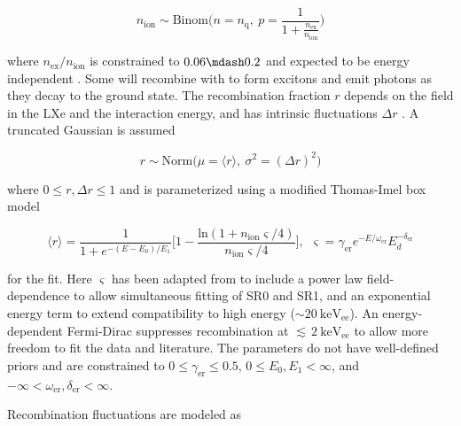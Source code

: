 \begin{equation}
n_{\mathrm{ion}} \sim \mathrm{Binom} \Bigg(n = n_{\mathrm{q}},\ p = \frac{1}{1 + \frac{n_{\mathrm{ex}}}{n_{\mathrm{ion}}}} \Bigg)
\label{eq:er_nr_calibrations_parameter_determ_er_nions}
\end{equation}

\noindent where $n_{\mathrm{ex}} / n_{\mathrm{ion}}$ is constrained to $0.06 \mdash 0.2$ and expected to be energy independent
.  Some \electron will recombine with  to form
excitons and emit photons as they decay to the ground state.  The recombination fraction $r$ depends on the field in the LXe and the
interaction energy, and has intrinsic fluctuations $\Delta r$ .  A truncated Gaussian is assumed

\vspace{-10pt}

\begin{equation}
r \sim \mathrm{Norm} \Big( \mu = \langle r \rangle,\ \sigma^2 = (\Delta r)^2 \Big)
\end{equation}

\noindent where $0 \leq r, \Delta r \leq 1$ and is parameterized using a modified Thomas-Imel box model 

\vspace{-15pt}

\begin{equation}
\langle r \rangle = \frac{1}{1 + e^{-(E - E_0) / E_1}}
\bigg[ 1 - \frac{\mathrm{ln}(1 + n_{\mathrm{ion}} \varsigma / 4)}{n_{\mathrm{ion}} \varsigma / 4} \bigg]
,\ \ \varsigma = \gamma_{\mathrm{er}} e^{-E / \omega_{\mathrm{er}}} E_d^{-\delta_{\mathrm{er}}}
\label{eq:er_nr_calibrations_parameter_determ_ti}
\end{equation}

\noindent for the fit.  Here $\varsigma$ has been adapted from  to include a power law field-dependence to allow
simultaneous fitting of SR0 and SR1, and an exponential energy term to extend compatibility to high energy
(${\sim} 20\ \mathrm{keV_{ee}}$).  An energy-dependent Fermi-Dirac suppresses recombination at
${\lesssim}\, 2\ \mathrm{keV_{ee}}$ to allow more freedom to fit the data and literature.  The parameters do not have well-defined priors
and are constrained to $0 \leq \gamma_{\mathrm{er}} \leq 0.5$, $0 \leq E_0, E_1 < \infty$, and
$-\infty < \omega_{\mathrm{er}}, \delta_{\mathrm{er}} < \infty$.

Recombination fluctuations are modeled as

